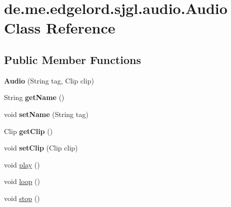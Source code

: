 \hypertarget{classde_1_1me_1_1edgelord_1_1sjgl_1_1audio_1_1_audio}{}\section{de.\+me.\+edgelord.\+sjgl.\+audio.\+Audio Class Reference}
\label{classde_1_1me_1_1edgelord_1_1sjgl_1_1audio_1_1_audio}
\subsection*{Public Member Functions}
\begin{DoxyCompactItemize}
\item 
\mbox{\label{classde_1_1me_1_1edgelord_1_1sjgl_1_1audio_1_1_audio_a13ee311071d7068e5ae7997b0266a3c5}} 
{\bfseries Audio} (String tag, Clip clip)
\item 
\mbox{\label{classde_1_1me_1_1edgelord_1_1sjgl_1_1audio_1_1_audio_a4b34b06bc7440c084249ae098eb8fe06}} 
String {\bfseries get\+Name} ()
\item 
\mbox{\label{classde_1_1me_1_1edgelord_1_1sjgl_1_1audio_1_1_audio_aa9b4566ab537ed67744c38887839d8a3}} 
void {\bfseries set\+Name} (String tag)
\item 
\mbox{\label{classde_1_1me_1_1edgelord_1_1sjgl_1_1audio_1_1_audio_ad3571669b120139b2343b5fa7a225298}} 
Clip {\bfseries get\+Clip} ()
\item 
\mbox{\label{classde_1_1me_1_1edgelord_1_1sjgl_1_1audio_1_1_audio_aba8fc977249cf5f42d2b5df7272e081b}} 
void {\bfseries set\+Clip} (Clip clip)
\item 
void \mbox{\hyperlink{classde_1_1me_1_1edgelord_1_1sjgl_1_1audio_1_1_audio_ac87651401394ee2e141c099a175cd7cb}{play}} ()
\item 
void \mbox{\hyperlink{classde_1_1me_1_1edgelord_1_1sjgl_1_1audio_1_1_audio_a654692b8ee1f0d298af938b2c76e6a54}{loop}} ()
\item 
void \mbox{\hyperlink{classde_1_1me_1_1edgelord_1_1sjgl_1_1audio_1_1_audio_a2e9d9c2e43c4bab399c7f360c8f90ce2}{stop}} ()
\end{DoxyCompactItemize}


